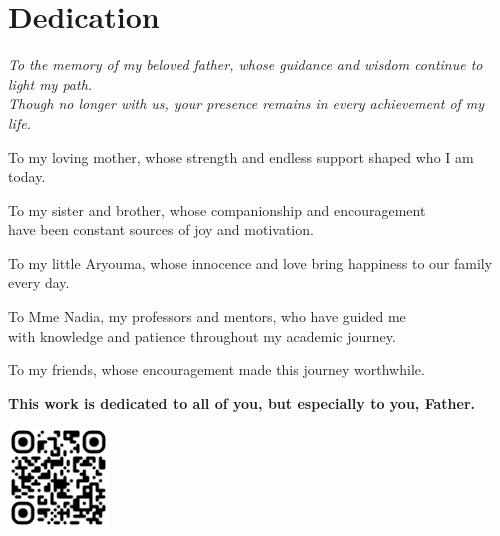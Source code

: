 \chapter*{\centering Dedication}

\begin{center}
{\itshape\large 
To the memory of my beloved father, whose guidance and wisdom continue to light my path. \\
Though no longer with us, your presence remains in every achievement of my life.

\vspace{0.8cm}

To my loving mother, whose strength and endless support shaped who I am today.

\vspace{0.8cm}

To my sister and brother, whose companionship and encouragement \\
have been constant sources of joy and motivation.

\vspace{0.8cm}

To my little Aryouma, whose innocence and love bring happiness to our family every day.

\vspace{0.8cm}

To Mme Nadia, my professors and mentors, who have guided me \\
with knowledge and patience throughout my academic journey.

\vspace{0.8cm}

To my friends, whose encouragement made this journey worthwhile.

\vspace{0.8cm}

\textbf{This work is dedicated to all of you, but especially to you, Father.}
}
\end{center}

\vspace{0.5cm}

\begin{center}
\includegraphics[width=0.2\textwidth]{images/qr-code-dedication.png}
\end{center}

